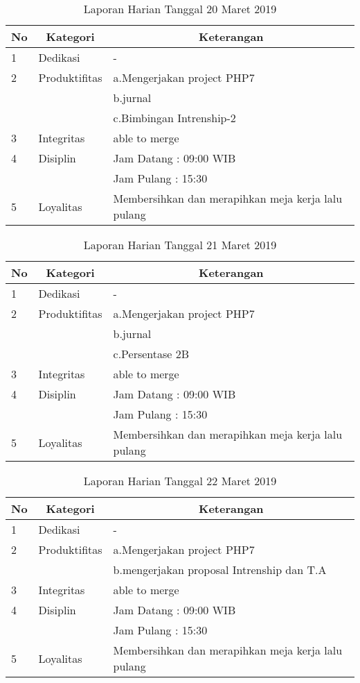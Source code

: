 \begin{table}[htp]
\caption{Laporan Harian Tanggal 20 Maret 2019}
\label{tab:lh200319}
\begin{tabular}{|l|l|l|}
\hline
\textbf{No} & \multicolumn{1}{c|}{\textbf{Kategori}} & \multicolumn{1}{c|}{\textbf{Keterangan}} \\ \hline
1 & Dedikasi & - \\ \hline
2 & Produktifitas & a.Mengerjakan project PHP7 \\
   & & b.jurnal \\ \hline
   & & c.Bimbingan Intrenship-2 \\ \hline
3 & Integritas & able to merge \\ \hline
4 & Disiplin & Jam Datang : 09:00 WIB \\
   &  & Jam Pulang : 15:30 \\ \hline
5 & Loyalitas & Membersihkan dan merapihkan meja kerja lalu pulang \\ \hline
\end{tabular}
\end{table}

\begin{table}[htp]
\caption{Laporan Harian Tanggal 21 Maret 2019}
\label{tab:lh210319}
\begin{tabular}{|l|l|l|}
\hline
\textbf{No} & \multicolumn{1}{c|}{\textbf{Kategori}} & \multicolumn{1}{c|}{\textbf{Keterangan}} \\ \hline
1 & Dedikasi & - \\ \hline
2 & Produktifitas & a.Mengerjakan project PHP7 \\
   & & b.jurnal \\ \hline
   & & c.Persentase 2B \\ \hline
3 & Integritas & able to merge \\ \hline
4 & Disiplin & Jam Datang : 09:00 WIB \\
   &  & Jam Pulang : 15:30 \\ \hline
5 & Loyalitas & Membersihkan dan merapihkan meja kerja lalu pulang \\ \hline
\end{tabular}
\end{table}

\begin{table}[htp]
\caption{Laporan Harian Tanggal 22 Maret 2019}
\label{tab:lh220319}
\begin{tabular}{|l|l|l|}
\hline
\textbf{No} & \multicolumn{1}{c|}{\textbf{Kategori}} & \multicolumn{1}{c|}{\textbf{Keterangan}} \\ \hline
1 & Dedikasi & - \\ \hline
2 & Produktifitas & a.Mengerjakan project PHP7 \\
   & & b.mengerjakan proposal Intrenship dan T.A \\ \hline
3 & Integritas & able to merge \\ \hline
4 & Disiplin & Jam Datang : 09:00 WIB \\
   &  & Jam Pulang : 15:30 \\ \hline
5 & Loyalitas & Membersihkan dan merapihkan meja kerja lalu pulang \\ \hline
\end{tabular}
\end{table}